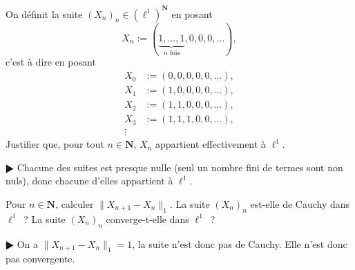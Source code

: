 \documentclass[11pt,a4paper]{article}
\def\N{\mathbf{N}}
\theoremstyle{plain}
\theoremstyle{definition}
\begin{document}
\begin{Exercice}[7 points]
\begin{Question} On d\'efinit la suite $(X_n)_n \in (\ell^1)^\N$ en posant
\[ X_n := (\underbrace{1,\dots,1}_{n \text{ fois}},0,0,0,\dots), \]
c'est \`a dire en posant
\begin{align*}
  X_0 &:= (0,0,0,0,0,\dots),\\
  X_1 &:= (1,0,0,0,0,\dots),\\
  X_2 &:= (1,1,0,0,0,\dots),\\
  X_3 &:= (1,1,1,0,0,\dots),\\
  \vdots
\end{align*}
Justifier que, pour tout $n \in \N$, $X_n$ appartient effectivement \`a $\ell^1$.
\end{Question}

\begin{corr} $\RHD$ Chacune des suites est presque nulle (seul un nombre fini de
termes sont non nuls), donc chacune d'elles appartient \`a $\ell^1$. 
\end{corr}

\begin{Question} Pour $n \in \N$, calculer $\|X_{n+1}-X_n\|_1$.
La suite $(X_n)_n$ est-elle de Cauchy dans $\ell^1$~? 
La suite $(X_n)_n$ converge-t-elle dans $\ell^1$~? 
\end{Question}

\begin{corr} $\RHD$ On a $\|X_{n+1}-X_n\|_1=1$, la suite n'est donc pas de Cauchy. Elle
n'est donc pas convergente.
\end{corr}

\end{Exercice}

\end{document}
